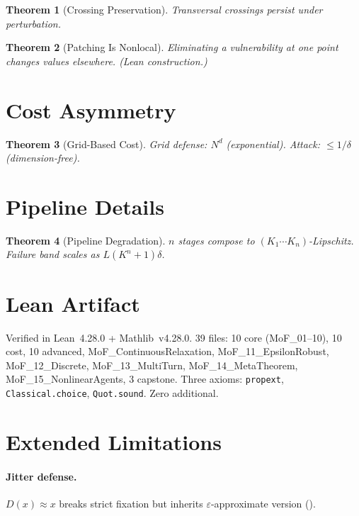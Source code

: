 \documentclass[11pt]{article}
\newtheorem{theorem}{Theorem}[section]
\begin{document}
\begin{theorem}[Crossing Preservation]
Transversal crossings persist under perturbation.
\end{theorem}

\begin{theorem}[Patching Is Nonlocal]
Eliminating a vulnerability at one point changes values elsewhere. (Lean construction.)
\end{theorem}

\section{Cost Asymmetry}

\begin{theorem}[Grid-Based Cost]
Grid defense: $N^d$ (exponential). Attack: $\leq 1/\delta$ (dimension-free).
\end{theorem}

\section{Pipeline Details}
\label{sec:pipeline-app}

\begin{theorem}[Pipeline Degradation]
\label{thm:pipeline-app}
$n$ stages compose to $(K_1 \cdots K_n)$-Lipschitz. Failure band scales as $L(K^n+1)\delta$.
\end{theorem}

\section{Lean Artifact}
\label{sec:artifact-app}

Verified in Lean~4.28.0 + Mathlib~v4.28.0. 39 files: 10 core (MoF\_01--10), 10 cost, 10 advanced, MoF\_ContinuousRelaxation, MoF\_11\_EpsilonRobust, MoF\_12\_Discrete, MoF\_13\_MultiTurn, MoF\_14\_MetaTheorem, MoF\_15\_NonlinearAgents, 3 capstone. Three axioms: \texttt{propext}, \texttt{Classical.choice}, \texttt{Quot.sound}. Zero additional.

\section{Extended Limitations}
\label{sec:limitations-app}

\paragraph{Jitter defense.} $D(x) \approx x$ breaks strict fixation but inherits $\varepsilon$-approximate version ().
\end{document}
